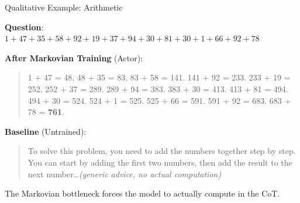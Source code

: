 \documentclass[aspectratio=169]{beamer}
\begin{document}
%
%

\begin{frame}{Qualitative Example: Arithmetic}

\textbf{Question}: $1 + 47 + 35 + 58 + 92 + 19 + 37 + 94 + 30 + 81 + 30 + 1 + 66 + 92 + 78$

\bigskip
\textbf{After Markovian Training} (Actor):
\begin{quote}
\small
1 + 47 = 48. 48 + 35 = 83. 83 + 58 = 141. 141 + 92 = 233. 233 + 19 = 252. 252 + 37 = 289. 289 + 94 = 383. 383 + 30 = 413. 413 + 81 = 494. 494 + 30 = 524. 524 + 1 = 525. 525 + 66 = 591. 591 + 92 = 683. 683 + 78 = \textbf{761}.
\end{quote}

\textbf{Baseline} (Untrained):
\begin{quote}
\small
To solve this problem, you need to add the numbers together step by step. You can start by adding the first two numbers, then add the result to the next number\ldots \textit{(generic advice, no actual computation)}
\end{quote}

\vspace{0.3cm}
\begin{center}
\colorbox{mkgreen!10}{\parbox{0.8\textwidth}{\centering
The Markovian bottleneck forces the model to actually compute in the CoT.
}}
\end{center}
\end{frame}
\end{document}
